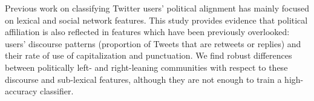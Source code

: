 Previous work on classifying Twitter users' political alignment has mainly focused on lexical and social network features. This study provides evidence that political affiliation is also reflected in features which have been previously overlooked: users' discourse patterns (proportion of Tweets that are retweets or replies) and their rate of use of capitalization and punctuation. We find robust differences between politically left- and right-leaning communities with respect to these discourse and sub-lexical features, although they are not enough to train a high-accuracy classifier.
